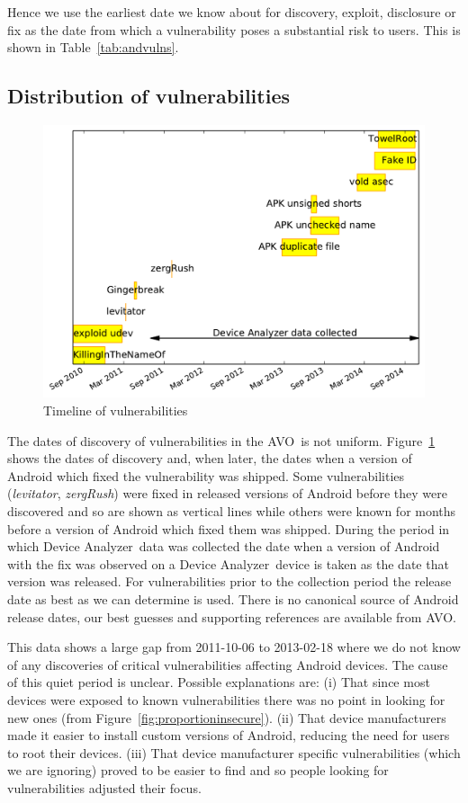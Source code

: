 \documentclass[conference,a4paper,twoside]{IEEEtran}
\newcommand{\da}{Device Analyzer}
\newcommand{\avo}{AVO}
\begin{document}
Hence we use the earliest date we know about for discovery, exploit, disclosure or fix as the date from which a vulnerability poses a substantial risk to users.
This is shown in Table~\ref{tab:andvulns}.


\subsection{Distribution of vulnerabilities}
\begin{figure}
 \centering
 \includegraphics[width=\columnwidth]{figures/vulnerabilities_timeline}
 \caption{Timeline of vulnerabilities}
 \label{fig:vulnerabilities_timeline}
\end{figure}

The dates of discovery of vulnerabilities in the \avo\ is not uniform.
Figure~\ref{fig:vulnerabilities_timeline} shows the dates of discovery and, when later, the dates when a version of Android which fixed the vulnerability was shipped.
Some vulnerabilities (\emph{levitator}, \emph{zergRush}) were fixed in released versions of Android before they were discovered and so are shown as vertical lines while others were known for months before a version of Android which fixed them was shipped.
During the period in which \da\ data was collected the date when a version of Android with the fix was observed on a \da\ device is taken as the date that version was released.
For vulnerabilities prior to the collection period the release date as best as we can determine is used.
There is no canonical source of Android release dates, our best guesses and supporting references are available from \avo.

This data shows a large gap from 2011-10-06 to 2013-02-18 where we do not know of any discoveries of critical vulnerabilities affecting Android devices.
The cause of this quiet period is unclear.
Possible explanations are: (i) That since most devices were exposed to known vulnerabilities there was no point in looking for new ones (from Figure~\ref{fig:proportioninsecure}).
(ii) That device manufacturers made it easier to install custom versions of Android, reducing the need for users to root their devices.
(iii) That device manufacturer specific vulnerabilities (which we are ignoring) proved to be easier to find and so people looking for vulnerabilities adjusted their focus.
\end{document}
